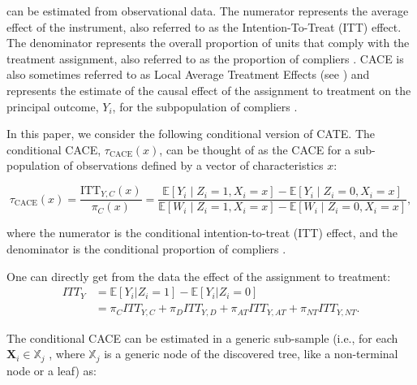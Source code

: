 can be estimated from observational data. The numerator represents the average effect of the instrument, also referred to as the Intention-To-Treat (ITT) effect. 
The denominator represents the overall proportion of units that comply with the treatment assignment, also referred to as the proportion of compliers \cite{Angrist1996}.
CACE is also sometimes referred to as Local Average Treatment Effects (see \cite{AngristPischke2008}) and represents the estimate of the causal effect of the assignment to treatment on the principal outcome, $Y_i$, for the subpopulation of compliers \cite{ImbensRubin2015}.



In this paper, we consider the following conditional version of CATE. The conditional CACE, $\tau_{\text{CACE}}(x)$, can be thought of as the CACE for a sub-population of observations defined by a vector of characteristics $x$:

\[
\tau_{\text{CACE}}(x) = \frac{\text{ITT}_{Y,C}(x)}{\pi_C(x)} = \frac{\mathbb{E}[Y_i \mid Z_i = 1, X_i = x] - \mathbb{E}[Y_i \mid Z_i = 0, X_i = x]}{\mathbb{E}[W_i \mid Z_i = 1, X_i = x] - \mathbb{E}[W_i \mid Z_i = 0, X_i = x]},
\tag{6}
\]

where the numerator is the conditional intention-to-treat (ITT) effect, and the denominator is the conditional proportion of compliers \cite{Angrist1996}.



One can directly get from the data the effect of the assignment to treatment: 
$$
\begin{aligned}
ITT_Y &= \mathbb{E}[Y_i|Z_i=1] - \mathbb{E}[Y_i|Z_i=0] \\
&= \pi_C ITT_{Y,C} + \pi_D ITT_{Y,D} + \pi_{AT} ITT_{Y,AT} + \pi_{NT} ITT_{Y,NT}.
\end{aligned}
$$






The conditional CACE can be estimated in a generic sub-sample (i.e., for each $\mathbf{X}_i \in \mathbb{X}_j$ , where $\mathbb{X}_j$ is a
generic node of the discovered tree, like a non-terminal node or a leaf) as: